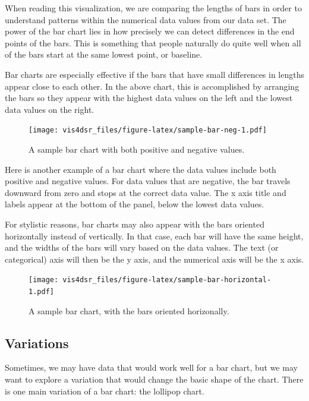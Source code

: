 \documentclass[
]{krantz}
\begin{document}
When reading this visualization, we are comparing the lengths of bars in order to
understand patterns within the numerical data values from our data set. The power
of the bar chart lies in how precisely we can detect differences in the
end points of the bars. This is something that people naturally do quite well
when all of the bars start at the same lowest point, or baseline.

Bar charts are especially effective if the bars that have small differences in
lengths appear close to each other. In the above chart, this is accomplished by
arranging the bars so they appear with the highest data values on the left and
the lowest data values on the right.

\begin{figure}
\centering
\texttt{[image: vis4dsr\_files/figure-latex/sample-bar-neg-1.pdf]}
\caption{\label{fig:sample-bar-neg}A sample bar chart with both positive and negative values.}
\end{figure}

Here is another example of a bar chart where the data values include both positive
and negative values. For data values that are negative, the bar travels downward
from zero and stops at the correct data value. The x axis title and labels appear
at the bottom of the panel, below the lowest data values.

For stylistic reasons, bar charts may also appear with the bars oriented horizontally
instead of vertically. In that case, each bar will have the same height, and the widths
of the bars will vary based on the data values. The text (or categorical) axis will then
be the y axis, and the numerical axis will be the x axis.

\begin{figure}
\centering
\texttt{[image: vis4dsr\_files/figure-latex/sample-bar-horizontal-1.pdf]}
\caption{\label{fig:sample-bar-horizontal}A sample bar chart, with the bars oriented horizonally.}
\end{figure}

\hypertarget{variations}{%
\subsection{Variations}\label{variations}}

Sometimes, we may have data that would work well for a bar chart, but we may want to
explore a variation that would change the basic shape of the chart. There is one main
variation of a bar chart: the lollipop chart.
\end{document}

